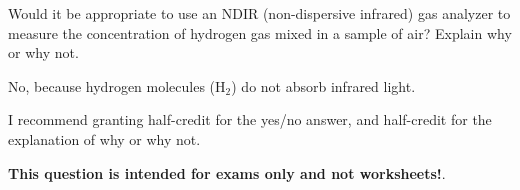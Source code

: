 

Would it be appropriate to use an NDIR (non-dispersive infrared) gas analyzer to measure the concentration of hydrogen gas mixed in a sample of air?  Explain why or why not.







No, because hydrogen molecules (H$_{2}$) do not absorb infrared light.

\vskip 10pt

I recommend granting half-credit for the yes/no answer, and half-credit for the explanation of why or why not.







{\bf This question is intended for exams only and not worksheets!}.



